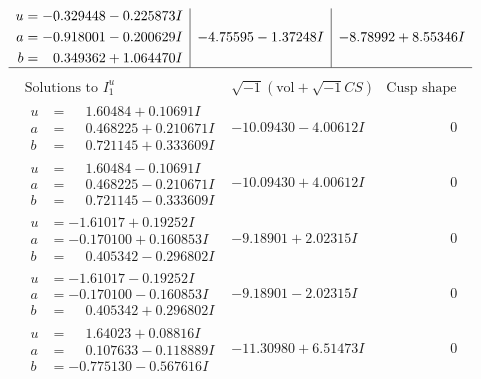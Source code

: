 \documentclass[1p]{elsarticle_modified}
\theoremstyle{definition}
\newcommand{\I}{\sqrt{-1}}
\begin{document}
$$\begin{array}{c|c|c}
\begin{aligned}
u &= -0.329448 - 0.225873 I \\
a &= -0.918001 - 0.200629 I \\
b &= \phantom{-}0.349362 + 1.064470 I\end{aligned}
 & -4.75595 - 1.37248 I & -8.78992 + 8.55346 I\\
 \hline 
 \end{array}$$\newpage$$\begin{array}{c|c|c}  
\text{Solutions to }I^u_{1}& \I (\text{vol} + \sqrt{-1}CS) & \text{Cusp shape}\\
 \hline 
\begin{aligned}
u &= \phantom{-}1.60484 + 0.10691 I \\
a &= \phantom{-}0.468225 + 0.210671 I \\
b &= \phantom{-}0.721145 + 0.333609 I\end{aligned}
 & -10.09430 - 4.00612 I & \phantom{-0.000000 } 0 \\ \hline\begin{aligned}
u &= \phantom{-}1.60484 - 0.10691 I \\
a &= \phantom{-}0.468225 - 0.210671 I \\
b &= \phantom{-}0.721145 - 0.333609 I\end{aligned}
 & -10.09430 + 4.00612 I & \phantom{-0.000000 } 0 \\ \hline\begin{aligned}
u &= -1.61017 + 0.19252 I \\
a &= -0.170100 + 0.160853 I \\
b &= \phantom{-}0.405342 - 0.296802 I\end{aligned}
 & -9.18901 + 2.02315 I & \phantom{-0.000000 } 0 \\ \hline\begin{aligned}
u &= -1.61017 - 0.19252 I \\
a &= -0.170100 - 0.160853 I \\
b &= \phantom{-}0.405342 + 0.296802 I\end{aligned}
 & -9.18901 - 2.02315 I & \phantom{-0.000000 } 0 \\ \hline\begin{aligned}
u &= \phantom{-}1.64023 + 0.08816 I \\
a &= \phantom{-}0.107633 - 0.118889 I \\
b &= -0.775130 - 0.567616 I\end{aligned}
 & -11.30980 + 6.51473 I & \phantom{-0.000000 } 0 \\ \hline\begin{aligned}

\end{aligned}
\end{array}$$
\end{document}
